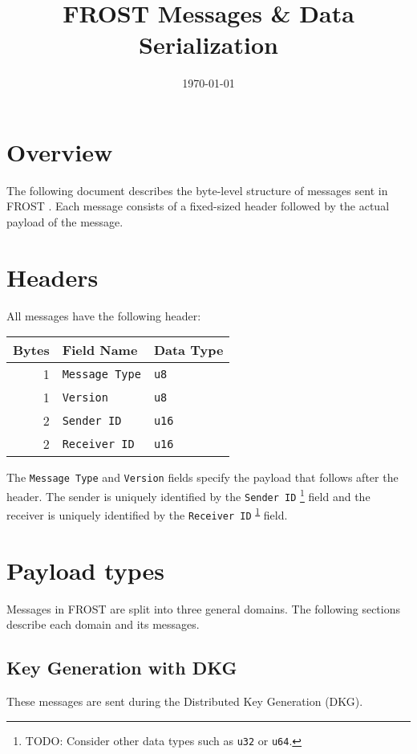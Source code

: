 \documentclass[11pt]{article}
\date{\today}
\title{FROST Messages \& Data Serialization}
\begin{document}
\maketitle
\tableofcontents


\section{Overview}
\label{sec:org5ade9fe}
The following document describes the byte-level structure of messages sent in
FROST \cite{frost}. Each message consists of a fixed-sized header followed by the
actual payload of the message.

\section{Headers}
\label{sec:orge6828d4}
All messages have the following header:

\begin{center}
\begin{tabular}{rll}
Bytes & Field Name & Data Type\\
\hline
1 & \texttt{Message Type} & \texttt{u8}\\
1 & \texttt{Version} & \texttt{u8}\\
2 & \texttt{Sender ID} & \texttt{u16}\\
2 & \texttt{Receiver ID} & \texttt{u16}\\
\end{tabular}
\end{center}

The \texttt{Message Type} and \texttt{Version} fields specify the payload that follows after
the header. The sender is uniquely identified by the \texttt{Sender ID} \footnote{TODO: Consider other data types such as \texttt{u32} or \texttt{u64}.\label{orgfc727db}} field
and the receiver is uniquely identified by the \texttt{Receiver ID} \textsuperscript{\ref{orgfc727db}} field.

\section{Payload types}
\label{sec:orgd0a1d86}
Messages in FROST are split into three general domains. The following sections
describe each domain and its messages.

\subsection{Key Generation with DKG}
\label{sec:orged95a4f}
These messages are sent during the Distributed Key Generation (DKG).
\end{document}
